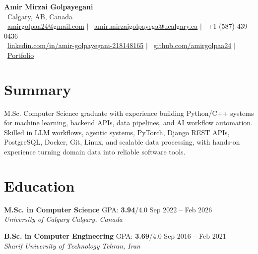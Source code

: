 \documentclass[a4paper,10pt]{article}
\newcommand{\resumeEducationSubheading}[5]{
    \textbf{#1} \hfill #2 \hfill #3 \\
    \textit{#4} \hfill \textit{#5}
}
\begin{document}

\begin{center}
    {\LARGE \textbf{Amir Mirzai Golpayegani}} \\[0.25em]
    \faMapMarker*~Calgary, AB, Canada \\[0.25em]
    \faEnvelope~\href{mailto:amirgolpaa24@gmail.com}{amirgolpaa24@gmail.com}
    $|$
    \faEnvelope~\href{mailto:amir.mirzaigolpayega@ucalgary.ca}{amir.mirzaigolpayega@ucalgary.ca}
    $|$
    \faPhone*~+1 (587) 439-0436 \\[0.25em]
    \faLinkedin~\href{https://linkedin.com/in/amir-golpayegani-218148165}{linkedin.com/in/amir-golpayegani-218148165}
    $|$
    \faGithub~\href{https://github.com/amirgolpaa24}{github.com/amirgolpaa24}
    $|$
    \faGlobe~\href{https://amir-portfolio-navy.vercel.app/}{Portfolio}
\end{center}


\section*{Summary}

M.Sc. Computer Science graduate with experience building Python/C++ systems for machine learning, backend APIs, data pipelines, and AI workflow automation. Skilled in LLM workflows, agentic systems, PyTorch, Django REST APIs, PostgreSQL, Docker, Git, Linux, and scalable data processing, with hands-on experience turning domain data into reliable software tools.


\section*{Education}

\resumeEducationSubheading
{M.Sc. in Computer Science}
{GPA: \textbf{3.94}/4.0}
{Sep 2022 -- Feb 2026}
{University of Calgary}
{Calgary, Canada}

\vspace{0.35em}

\resumeEducationSubheading
{B.Sc. in Computer Engineering}
{GPA: \textbf{3.69}/4.0}
{Sep 2016 -- Feb 2021}
{Sharif University of Technology}
{Tehran, Iran}

\end{document}
